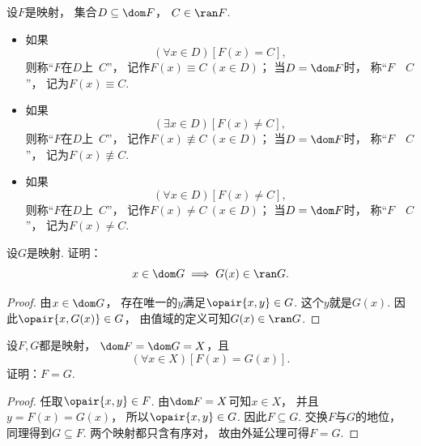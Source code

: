 \begin{definition}
设\(F\)是映射，
集合\(D \subseteq \dom F\)，
\(C \in \ran F\).
\begin{itemize}
	\item 如果\begin{equation*}
		(\forall x \in D)[F(x) = C],
	\end{equation*}
	则称“\(F\)在\(D\)上~\(C\)”，
	记作\(F(x) \equiv C\ (x \in D)\)；
	当\(D=\dom F\)时，
	称“\(F\)~~\(C\)”，
	记为\(F(x) \equiv C\).
	\item 如果\begin{equation*}
		(\exists x \in D)[F(x) \neq C],
	\end{equation*}
	则称“\(F\)在\(D\)上~\(C\)”，
	记作\(F(x) \not\equiv C\ (x \in D)\)；
	当\(D=\dom F\)时，
	称“\(F\)~~\(C\)”，
	记为\(F(x) \not\equiv C\).
	\item 如果\begin{equation*}
		(\forall x \in D)[F(x) \neq C],
	\end{equation*}
	则称“\(F\)在\(D\)上~\(C\)”，
	记作\(F(x) \neq C\ (x \in D)\)；
	当\(D=\dom F\)时，
	称“\(F\)~~\(C\)”，
	记为\(F(x) \neq C\).
\end{itemize}
\end{definition}

\begin{example}\label{example:映射.定义域中的元素在映射下的像一定属于值域}
    设\(G\)是映射.
    证明：
    \begin{equation*}
        x \in \dom G
        \implies
        G(x) \in \ran G.
    \end{equation*}
    \begin{proof}
        由\(x\in\dom G\)，
        存在唯一的\(y\)满足\(\opair{x,y}\in G\).
        这个\(y\)就是\(G(x)\).
        因此\(\opair{x,G(x)}\in G\)，
        由值域的定义可知\(G(x)\in\ran G\).
    \end{proof}
\end{example}

\begin{example}
    设\(F,G\)都是映射，
    \(\dom F = \dom G = X\)，且
    \begin{equation*}
        (\forall x \in X)[F(x) = G(x)].
    \end{equation*}
    证明：\(F=G\).
    \begin{proof}
        任取\(\opair{x,y}\in F\).
        由\(\dom F=X\)可知\(x\in X\)，
        并且\(y=F(x)=G(x)\)，
        所以\(\opair{x,y}\in G\).
        因此\(F\subseteq G\).
        交换\(F\)与\(G\)的地位，
        同理得到\(G\subseteq F\).
        两个映射都只含有序对，
        故由外延公理可得\(F=G\).
    \end{proof}
\end{example}

